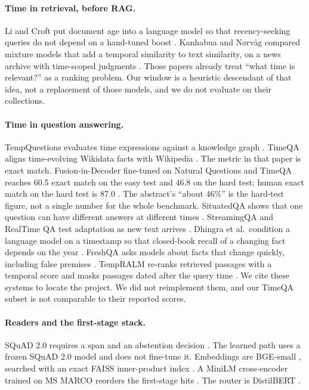 \documentclass[11pt]{article}
\begin{document}
\paragraph{Time in retrieval, before RAG.}
Li and Croft put document age into a language model so that recency-seeking queries do not depend on a hand-tuned boost \cite{li2003time}.
Kanhabua and N{\o}rv{\aa}g compared mixture models that add a temporal similarity to text similarity, on a news archive with time-scoped judgments \cite{kanhabua2011ranking}.
Those papers already treat ``what time is relevant?'' as a ranking problem.
Our window is a heuristic descendant of that idea, not a replacement of those models, and we do not evaluate on their collections.

\paragraph{Time in question answering.}
TempQuestions evaluates time expressions against a knowledge graph \cite{jia2018tempquestions}.
TimeQA aligns time-evolving Wikidata facts with Wikipedia \cite{chen2021timeqa}.
The metric in that paper is exact match.
Fusion-in-Decoder fine-tuned on Natural Questions and TimeQA reaches 60.5 exact match on the easy test and 46.8 on the hard test; human exact match on the hard test is 87.0 \cite{chen2021timeqa}.
The abstract's ``about 46\%'' is the hard-test figure, not a single number for the whole benchmark.
SituatedQA shows that one question can have different answers at different times \cite{zhang2021situatedqa}.
StreamingQA and RealTime QA test adaptation as new text arrives \cite{liska2022streamingqa,kasai2023realtimeqa}.
Dhingra et al.\ condition a language model on a timestamp so that closed-book recall of a changing fact depends on the year \cite{dhingra2022talm}.
FreshQA asks models about facts that change quickly, including false premises \cite{vu2023freshqa}.
TempRALM re-ranks retrieved passages with a temporal score and masks passages dated after the query time \cite{gade2024tempralm}.
We cite these systems to locate the project.
We did not reimplement them, and our TimeQA subset is not comparable to their reported scores.

\paragraph{Readers and the first-stage stack.}
SQuAD 2.0 requires a span and an abstention decision \cite{rajpurkar2018squad2}.
The learned path uses a frozen SQuAD 2.0 model and does not fine-tune it.
Embeddings are BGE-small \cite{xiao2024cpack}, searched with an exact FAISS inner-product index \cite{johnson2019faiss}.
A MiniLM cross-encoder trained on MS MARCO reorders the first-stage hits \cite{wang2020minilm,nguyen2016msmarco,reimers2019sbert}.
The router is DistilBERT \cite{sanh2019distilbert,devlin2019bert}.
\end{document}
